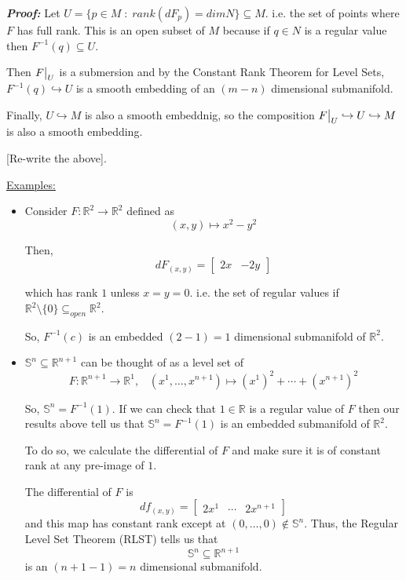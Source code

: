 \documentclass{article}
\newcommand{\R}{\mathbb{R}}
\newcommand{\restr}[2]{{%
  \left.\kern-\nulldelimiterspace %
  #1 %
  \vphantom{\big|} %
  \right|_{#2} %
  }}
\begin{document}
\vskip 0.5cm
\emph{\textbf{Proof:}} Let $U = \{p \in M \;:\; rank(dF_p) = dim N\} \subseteq M$. i.e. the set of points where $F$ has full rank. This is an open subset of $M$ because if $q \in N$ is a regular value then $F^{-1}(q) \subseteq U$.

\vskip 0.5cm
Then $\restr{F}{U}$ is a submersion and by the Constant Rank Theorem for Level Sets, $F^{-1}(q) \hookrightarrow U$ is a smooth embedding of an $(m-n)$ dimensional submanifold.

\vskip 0.5cm
Finally, $U \hookrightarrow M$ is also a smooth embeddnig, so the composition $\restr{F}{U} \hookrightarrow U \hookrightarrow M$ is also a smooth embedding.

[Re-write the above].

\vskip 0.5cm
\underline{Examples:} 
\begin{itemize}
  \item Consider $F : \R^2 \rightarrow \R^2$ defined as 
  \[ (x, y) \mapsto x^2 - y^2 \]
  
  Then, 
  \[ dF_{(x, y)} = \begin{bmatrix}
    2x & -2y
  \end{bmatrix} \]
  
  which has rank $1$ unless $x = y = 0$. i.e. the set of regular values if $\R^2 \setminus \{0\} \subseteq_{open} \R^2$.
  
  So, $F^{-1}(c)$ is an embedded $(2-1) = 1$ dimensional submanifold of $\R^2$.

  \vskip 0.5cm
  \item $\mathbb{S}^n \subseteq \R^{n+1}$ can be thought of as a level set of 
  \[  F : \R^{n+1} \rightarrow \R^{1}, \;\;\; (x^1, \dots, x^{n+1}) \mapsto (x^1)^2 + \cdots + (x^{n+1})^2 \]

  So, $\mathbb{S}^n = F^{-1}(1)$. If we can check that $1 \in \R$ is a regular value of $F$ then our results above tell us that $\mathbb{S}^n = F^{-1}(1)$ is an embedded submanifold of $\R^2$.

  \vskip 0.5cm
  To do so, we calculate the differential of $F$ and make sure it is of constant rank at any pre-image of $1$.

  \vskip 0.5cm
  The differential of $F$ is 
  \[ df_{(x, y)} = \begin{bmatrix}
    2x^1 & \cdots & 2x^{n+1}
  \end{bmatrix}  \]
  and this map has constant rank except at $(0, \dots, 0) \not\in \mathbb{S}^n$. Thus, the Regular Level Set Theorem (RLST) tells us that 
  \[ \mathbb{S}^n \subseteq \mathbb{R}^{n+1} \] is an $(n+1-1) = n$ dimensional submanifold.


\end{itemize}
\end{document}
